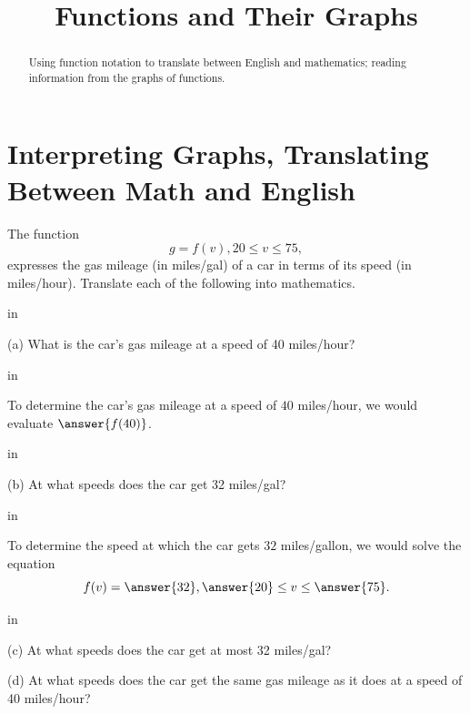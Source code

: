 \documentclass{ximera}
\title{Functions and Their Graphs}
\newcommand{\pskip}{\vskip 0.1 in}
\begin{document}
\begin{abstract}
Using function notation to translate between English and mathematics; reading information from the graphs of functions.
\end{abstract}
\maketitle



\section{Interpreting Graphs, Translating Between Math and English}

\begin{example}  \label{ExFun15}

The function
\[
   g = f(v) , 20 \leq v \leq 75 ,
\]
expresses the gas mileage (in miles/gal) of a car in terms of its speed (in miles/hour). Translate each of the following into mathematics.

\pskip


\noindent (a) What is the car's gas mileage at a speed of 40 miles/hour?

\pskip

\begin{hint}
To determine the car's gas mileage at a speed of $40$ miles/hour, we would evaluate $\answer{f(40)}$.
\end{hint}

\pskip

\noindent (b) At what speeds does the car get 32 miles/gal?

\pskip

\begin{hint}
To determine the speed at which the car gets $32$ miles/gallon, we would solve the equation
\[
    f(v) = \answer{32} , \answer{20} \leq v \leq \answer{75}.
\]
\end{hint}

\pskip

\noindent (c) At what speeds does the car get at most 32 miles/gal?





\noindent (d) At what speeds does the car get the same gas mileage as it does at a speed of 40 miles/hour?


\end{example}
\end{document}
